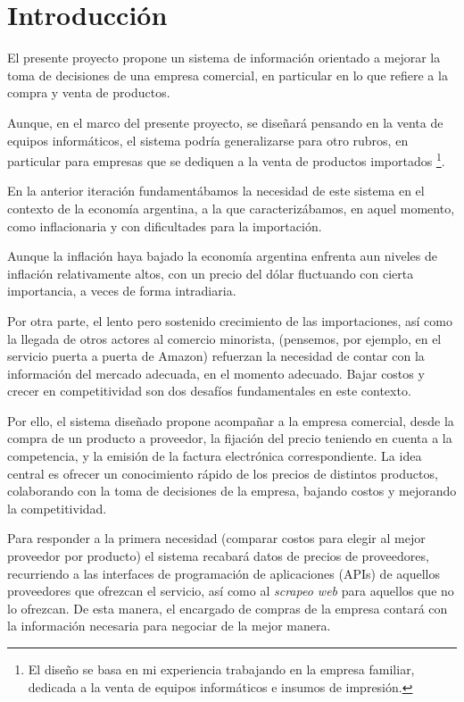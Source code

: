 \section{Introducción}

El presente proyecto propone un sistema de información
orientado a mejorar la toma de decisiones de una empresa comercial,
en particular en lo que refiere a la compra y venta de productos.

Aunque,
en el marco del presente proyecto,
se diseñará pensando en la venta de equipos informáticos,
el sistema podría generalizarse para otro rubros,
en particular para empresas que se dediquen a la venta de productos importados
\footnote{El diseño se basa en mi experiencia trabajando en la empresa familiar, 
dedicada a la venta de equipos informáticos e insumos de impresión.}.

En la anterior iteración fundamentábamos la necesidad de este sistema 
en el contexto de la economía argentina,
a la que caracterizábamos, 
en aquel momento, 
como inflacionaria 
y con dificultades para la importación.

Aunque la inflación haya bajado 
la economía argentina enfrenta aun niveles de inflación relativamente altos,
con un precio del dólar fluctuando con cierta importancia,
a veces de forma intradiaria.

Por otra parte,
el lento pero sostenido crecimiento de las importaciones,
así como la llegada de otros actores al comercio minorista,
(pensemos, por ejemplo, en el servicio puerta a puerta de Amazon)
refuerzan la necesidad de contar con la información del mercado adecuada,
en el momento adecuado.
Bajar costos y crecer en competitividad son dos desafíos fundamentales en este contexto.

Por ello, 
el sistema diseñado propone acompañar a la empresa comercial,
desde la compra de un producto a proveedor,
la fijación del precio teniendo en cuenta a la competencia,
y la emisión de la factura electrónica correspondiente.
La idea central es ofrecer un conocimiento rápido de los precios de distintos productos,
colaborando con la toma de decisiones de la empresa, bajando costos y mejorando la competitividad.

Para responder a la primera necesidad
(comparar costos para elegir al mejor proveedor por producto)
el sistema recabará datos de precios de proveedores,
recurriendo a las interfaces de programación de aplicaciones (APIs)
de aquellos proveedores que ofrezcan el servicio,
así como al \textit{scrapeo web} para aquellos que no lo ofrezcan.
De esta manera,
el encargado de compras de la empresa contará con la información necesaria para negociar de la mejor manera.

